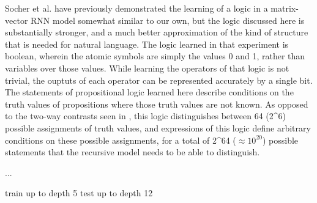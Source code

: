 Socher et al. \cite{socher2012semantic} have previously demonstrated the learning of a logic in a matrix-vector RNN model somewhat similar to our own, but the logic discussed here is substantially stronger, and a much better approximation of the kind of structure that is needed for natural language. The logic learned in that experiment is boolean, wherein the atomic symbols are simply the values 0 and 1, rather than variables over those values. While learning the operators of that logic is not trivial, the ouptuts of each operator can be represented accurately by a single bit. The statements of propositional logic learned here describe conditions on the truth values of propositions where those truth values are not known. As opposed to the two-way contrasts seen in \cite{socher2012semantic}, this logic distinguishes between 64 (2^6) possible assignments of truth values, and expressions of this logic define arbitrary conditions on these possible assignments, for a total of 2^{64} ($\approx 10^{20}$) possible statements that the recursive model needs to be able to distinguish.

...


train up to depth 5
test up to depth 12

